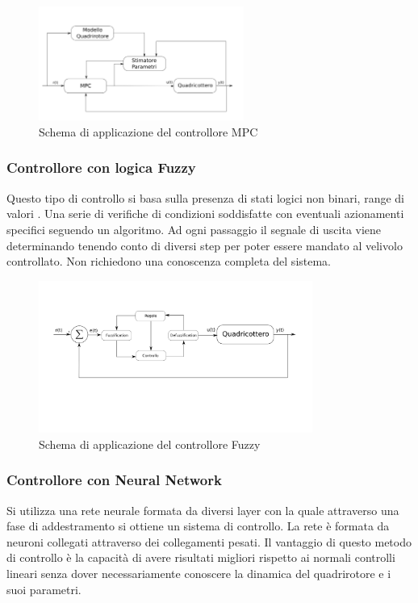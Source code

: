 \begin{figure}
	\centering
	\includegraphics[width=0.6\textwidth]{SistemaQuadrirotore/Figure/MPC}
	\caption{Schema di applicazione del controllore MPC}
\end{figure}

\subsubsection{Controllore con logica Fuzzy}

Questo tipo di controllo si basa sulla presenza di stati logici non binari, range di valori  . Una serie di verifiche di condizioni soddisfatte con eventuali azionamenti specifici seguendo un algoritmo. Ad ogni passaggio il segnale di uscita viene determinando tenendo conto di diversi step per poter essere mandato al velivolo controllato. Non richiedono una conoscenza completa del sistema.

\begin{figure}
	\centering
	\includegraphics[width=0.8\textwidth]{SistemaQuadrirotore/Figure/Fuzzy}
	\caption{Schema di applicazione del controllore Fuzzy}
\end{figure}

\subsubsection{Controllore con Neural Network}

Si utilizza una rete neurale formata da diversi layer con la quale attraverso una fase di addestramento si ottiene un sistema di controllo. La rete è formata da neuroni collegati attraverso dei collegamenti pesati. Il vantaggio di questo metodo di controllo è la capacità di avere risultati migliori rispetto ai normali controlli lineari senza dover necessariamente conoscere la dinamica del quadrirotore e i suoi parametri.

